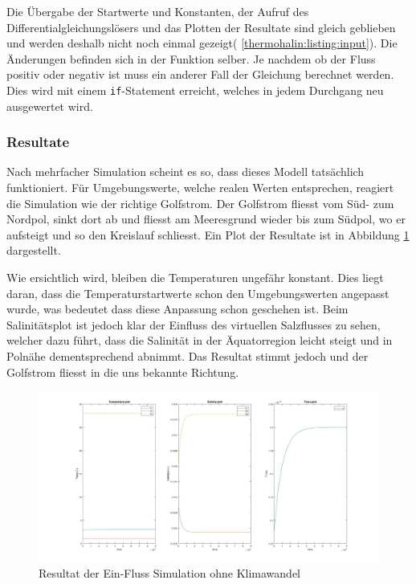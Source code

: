 Die Übergabe der Startwerte und Konstanten, der Aufruf des Differentialgleichungslösers und das Plotten der Resultate sind gleich geblieben und werden deshalb nicht noch einmal gezeigt( \ref{thermohalin:listing:input}). Die Änderungen befinden sich in der Funktion selber. Je nachdem ob der Fluss positiv oder negativ ist muss ein anderer Fall der Gleichung berechnet werden. Dies wird mit einem \texttt{if}-Statement erreicht, welches in jedem Durchgang neu ausgewertet wird. 




\subsubsection{Resultate} 

Nach mehrfacher Simulation scheint es so, dass dieses Modell tatsächlich funktioniert. Für Umgebungswerte, welche realen Werten entsprechen, reagiert die Simulation wie der richtige Golfstrom. Der Golfstrom fliesst vom Süd- zum Nordpol, sinkt dort ab und fliesst am Meeresgrund wieder bis zum Südpol, wo er aufsteigt und so den Kreislauf schliesst. Ein Plot der Resultate ist in Abbildung \ref{thermohalin:3b1f-skript} dargestellt.

Wie ersichtlich wird, bleiben die Temperaturen ungefähr konstant. Dies liegt daran, dass die Temperaturstartwerte schon den Umgebungswerten angepasst wurde, was bedeutet dass diese Anpassung schon geschehen ist. Beim Salinitätsplot ist jedoch klar der Einfluss des virtuellen Salzflusses zu sehen, welcher dazu führt, dass die Salinität in der Äquatorregion leicht steigt und in Polnähe dementsprechend abnimmt. Das Resultat stimmt jedoch und der Golfstrom fliesst in die uns bekannte Richtung.

\begin{figure}
	\centering
	\includegraphics[width=14cm]{thermohalin/Code/graphs/3b1f-skript.jpg}
	\caption{Resultat der Ein-Fluss Simulation ohne Klimawandel}
	\label{thermohalin:3b1f-skript}
\end{figure}


